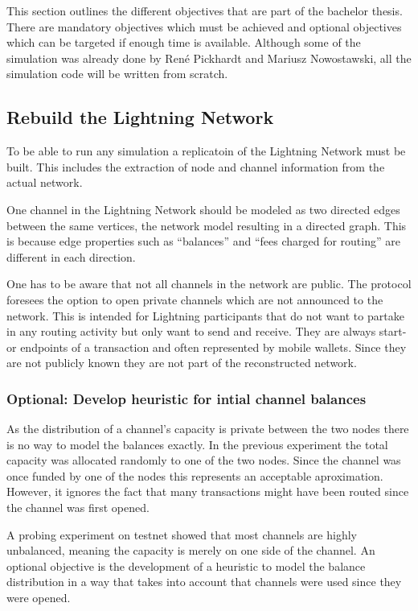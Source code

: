 \documentclass[final]{fhnwreport}       %
\begin{document}
This section outlines the different objectives that are part of the bachelor thesis. There are mandatory objectives which must be achieved and optional objectives which can be targeted if enough time is available. Although some of the simulation was already done by René Pickhardt and Mariusz Nowostawski, all the simulation code will be written from scratch.

\subsection{Rebuild the Lightning Network}\label{sec:o_rebuild}

To be able to run any simulation a replicatoin of the Lightning Network must be built. This includes the extraction of node and channel information from the actual network.

One channel in the Lightning Network should be modeled as two directed edges between the same vertices, the network model resulting in a directed graph. This is because edge properties such as ``balances'' and ``fees charged for routing'' are different in each direction. 

One has to be aware that not all channels in the network are public. The protocol foresees the option to open private channels which are not announced to the network. This is intended for Lightning participants that do not want to partake in any routing activity but only want to send and receive. They are always start- or endpoints of a transaction and often represented by mobile wallets. Since they are not publicly known they are not part of the reconstructed network. 

\subsubsection{Optional: Develop heuristic for intial channel balances}

As the distribution of a channel's capacity is private between the two nodes there is no way to model the balances exactly. In the previous experiment the total capacity was allocated randomly to one of the two nodes. Since the channel was once funded by one of the nodes this represents an acceptable aproximation. However, it ignores the fact that many transactions might have been routed since the channel was first opened. 

A probing experiment on testnet \cite{tikhomirov_probing_2020} showed that most channels are highly unbalanced, meaning the capacity is merely on one side of the channel. An optional objective is the development of a heuristic to model the balance distribution in a way that takes into account that channels were used since they were opened.
\end{document}
